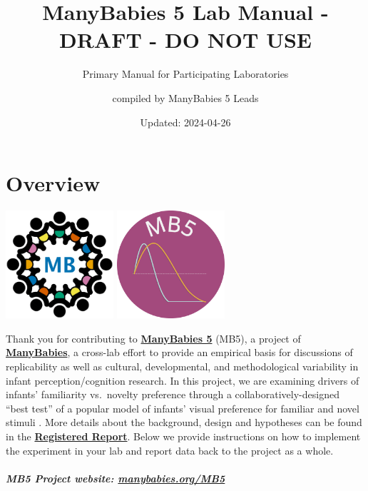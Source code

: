 \documentclass[
]{book}
\title{ManyBabies 5 Lab Manual - DRAFT - DO NOT USE}
\subtitle{Primary Manual for Participating Laboratories}
\author{compiled by ManyBabies 5 Leads}
\date{Updated: 2024-04-26}
\theoremstyle{definition}
\theoremstyle{definition}
\theoremstyle{definition}
\theoremstyle{definition}
\theoremstyle{remark}
\begin{document}
\maketitle

{
\setcounter{tocdepth}{1}
\tableofcontents
}
\hypertarget{overview}{%
\chapter{Overview}\label{overview}}

\includegraphics[width=0.3\textwidth,height=\textheight]{images/mb-logo.png} \includegraphics[width=0.3\textwidth,height=\textheight]{images/mb5-logo.png}

Thank you for contributing to \href{https://manybabies.org/MB5/}{\textbf{ManyBabies 5}} (MB5), a project of \href{https://manybabies.org/}{\textbf{ManyBabies}}, a cross-lab effort to provide an empirical basis for discussions of replicability as well as cultural, developmental, and methodological variability in infant perception/cognition research. In this project, we are examining drivers of infants' familiarity vs.~novelty preference through a collaboratively-designed ``best test'' of a popular model of infants' visual preference for familiar and novel stimuli \citep{hunterames}. More details about the background, design and hypotheses can be found in the \href{https://osf.io/preprints/psyarxiv/ck3vd}{\textbf{Registered Report}}. Below we provide instructions on how to implement the experiment in your lab and report data back to the project as a whole.

\hypertarget{mb5-project-website-manybabies.orgmb5}{%
\paragraph*{\texorpdfstring{\textbf{MB5 Project website:} \url{manybabies.org/MB5}}{MB5 Project website: manybabies.org/MB5}}\label{mb5-project-website-manybabies.orgmb5}}
\end{document}
